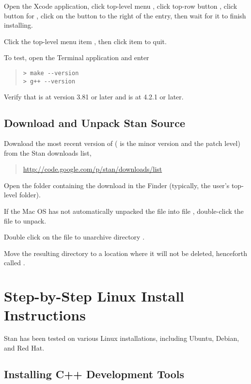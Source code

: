 Open the Xcode application, click top-level menu
, click top-row button ,
click button for , click on the 
button to the right of the  entry, then
wait for it to finish installing.  

Click the top-level menu item , then click item 
 to quit.

To test, open the Terminal application and enter

\begin{quote}
\begin{Verbatim}[fontshape=sl]
> make --version
> g++ --version
\end{Verbatim}
\end{quote}
%
Verify that  is at version 3.81 or later and 
is at 4.2.1 or later.


\subsection{Download and Unpack Stan Source}

Download the most recent version of 
( is the minor version and  the patch level) from
the Stan downloads list,
%
\begin{quote}
\url{http://code.google.com/p/stan/downloads/list}
\end{quote}

Open the folder containing the download in the Finder
(typically, the user's top-level  folder).

If the Mac OS has not automatically unpacked the 
file into file ,
double-click the  file to unpack.

Double click on the  file to unarchive
directory .

Move the resulting directory to a location where it will not be
deleted, henceforth called .


\section{Step-by-Step Linux Install Instructions}

Stan has been tested on various Linux installations, including
Ubuntu, Debian, and Red Hat.

\subsection{Installing C++ Development Tools}

